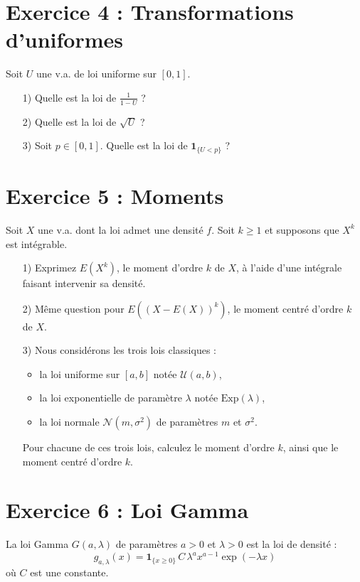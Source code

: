\documentclass[12pt,a4paper]{article}
\begin{document}
\section*{Exercice 4 : Transformations d’uniformes}
Soit $U$ une v.a. de loi uniforme sur $[0,1]$.
\begin{enumerate}
    \item[1)] Quelle est la loi de $\frac{1}{1-U}$ ?
    \item[2)] Quelle est la loi de $\sqrt{U}$ ?
    \item[3)] Soit $p \in [0,1]$. Quelle est la loi de $\mathbf{1}_{\{U < p\}}$ ?
\end{enumerate}

\section*{Exercice 5 : Moments}
Soit $X$ une v.a. dont la loi admet une densité $f$. Soit $k \geq 1$ et supposons que $X^k$ est intégrable.
\begin{enumerate}
    \item[1)] Exprimez $E(X^k)$, le moment d’ordre $k$ de $X$, à l’aide d’une intégrale faisant intervenir sa densité.
    \item[2)] Même question pour $E((X - E(X))^k)$, le moment centré d’ordre $k$ de $X$.
    \item[3)] Nous considérons les trois lois classiques :
    \begin{itemize}
        \item la loi uniforme sur $[a,b]$ notée $\mathcal{U}(a,b)$,
        \item la loi exponentielle de paramètre $\lambda$ notée $\mathrm{Exp}(\lambda)$,
        \item la loi normale $\mathcal{N}(m,\sigma^2)$ de paramètres $m$ et $\sigma^2$.
    \end{itemize}
    Pour chacune de ces trois lois, calculez le moment d’ordre $k$, ainsi que le moment centré d’ordre $k$.
\end{enumerate}

\section*{Exercice 6 : Loi Gamma}

La loi Gamma $G(a,\lambda)$ de paramètres $a > 0$ et $\lambda > 0$ est la loi de densité :
\[
g_{a,\lambda}(x) = \mathbf{1}_{\{x \geq 0\}} \, C \, \lambda^a x^{a-1} \exp(-\lambda x)
\]
où $C$ est une constante.
\end{document}
